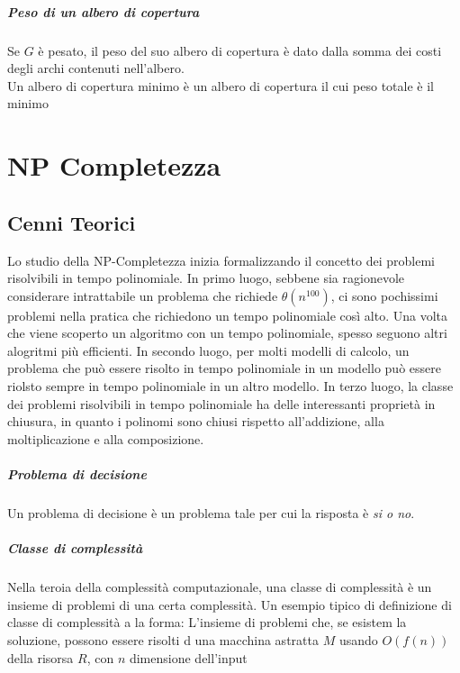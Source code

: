 \documentclass[12pt, a4paper, openany]{book}
\begin{document}
	\paragraph*{Peso di un albero di copertura} Se $G$ è pesato, il peso del suo albero di copertura è dato
	dalla somma dei costi degli archi contenuti nell'albero.
	\\Un albero di copertura minimo è un albero di copertura il cui peso totale è il minimo

	\chapter{NP Completezza} %
	\section{Cenni Teorici}
	Lo studio della NP-Completezza inizia formalizzando il concetto dei problemi risolvibili in tempo polinomiale.
	In primo luogo, sebbene sia ragionevole considerare intrattabile un problema che richiede $\theta(n^{100})$, ci sono pochissimi problemi nella pratica che richiedono un tempo polinomiale così alto.
	Una volta che viene scoperto un algoritmo con un tempo polinomiale, spesso seguono altri alogritmi più efficienti.
	In secondo luogo, per molti modelli di calcolo, un problema che può essere risolto in tempo polinomiale in un modello può essere riolsto sempre in tempo polinomiale in un altro modello.
	In terzo luogo, la classe dei problemi risolvibili in tempo polinomiale ha delle interessanti proprietà in chiusura, in quanto i polinomi sono chiusi rispetto all'addizione, alla moltiplicazione e alla composizione.

	\paragraph*{Problema di decisione}
	Un problema di decisione è un problema tale per cui la risposta è \emph{si o no}.
	\paragraph*{Classe di complessità}
	Nella teroia della complessità computazionale, una classe di complessità è un insieme di problemi di una certa complessità.
	Un esempio tipico di definizione di classe di complessità a la forma:
	L'insieme di problemi che, se esistem la soluzione, possono essere risolti d una macchina astratta $M$ usando $O(f(n))$ della risorsa $R$, con $n$ dimensione dell'input
\end{document}
